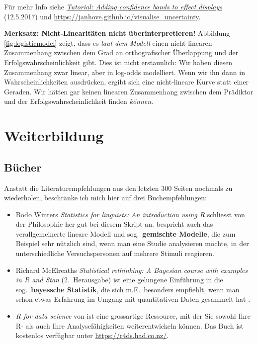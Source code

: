 \documentclass[oneside, 10pt]{book}\usepackage[]{graphicx}\usepackage[]{xcolor}
\begin{document}

Für mehr Info siehe
\href{https://janhove.github.io/reporting/2017/05/12/visualising-models-2}{\textit{Tutorial: Adding confidence bands to effect displays}} (12.5.2017)
und \url{https://janhove.github.io/visualise_uncertainty}.

\medskip

\begin{framed}
\textbf{Merksatz: Nicht-Linearitäten nicht überinterpretieren!}
Abbildung \ref{fig:logisticmodel} zeigt, dass es
\emph{laut dem Modell}
einen nicht-linearen Zusammenhang zwischen
dem Grad an orthografischer Überlappung und der
Erfolgswahrscheinlichkeit gibt.
Dies ist nicht erstaunlich: Wir haben diesen
Zusammenhang zwar linear, aber in log-odds modelliert.
Wenn wir ihn dann in Wahrscheinlichkeiten ausdrücken,
ergibt sich eine nicht-lineare Kurve statt einer Geraden.
Wir hätten gar keinen linearen Zusammenhang
zwischen dem Prädiktor und der Erfolgswahrscheinlichkeit
finden \emph{können}.
\end{framed}


\chapter{Weiterbildung}\label{ch:weiterbildung}
\section{Bücher}
Anstatt die Literaturempfehlungen aus den letzten 300 Seiten nochmals zu wiederholen,
beschränke ich mich hier auf drei Buchempfehlungen:
\begin{itemize}
 \item Bodo Winters \textit{Statistics for linguists: An introduction using R}
schliesst von der Philosophie her gut bei diesem Skript an.
\citet{Winter2019} bespricht auch das verallgemeinerte lineare Modell und sog.\
\textbf{gemischte Modelle}, die zum Beispiel sehr nützlich sind, wenn man
eine Studie analysieren möchte, in der unterschiedliche Versuchspersonen
auf mehrere Stimuli reagieren.

 \item Richard McElreaths
 \textit{Statistical rethinking: A Bayesian course with examples in R and Stan} (2.\ Herausgabe)
 ist eine gelungene Einführung in die sog.\ \textbf{bayessche Statistik},
 die sich m.E.\ besonders empfiehlt, wenn man schon etwas Erfahrung im Umgang mit
 quantitativen Daten gesammelt hat \citep{McElreath2020}.
 
 \item \textit{R for data science} von
 \citet{Wickham2017} ist eine grossartige Ressource,
 mit der Sie sowohl Ihre R- als auch Ihre Analysefähigkeiten
 weiterentwickeln können. Das Buch ist kostenlos verfügbar
 unter \url{https://r4ds.had.co.nz/}.
\end{itemize}
\end{document}
